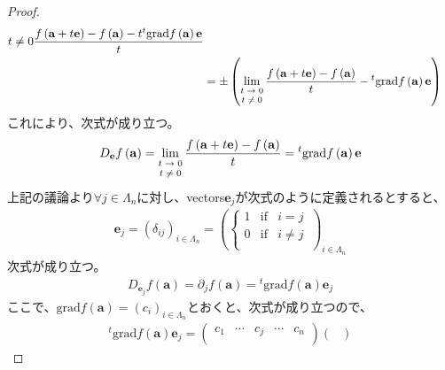 \documentclass[dvipdfmx]{jsarticle}
\begin{document}
\begin{proof}
\begin{align*}
{\begin{matrix}
t \neq 0 \\
\end{matrix}}\frac{f\left( \mathbf{a} + t\mathbf{e} \right) - f\left( \mathbf{a} \right) - t{}^{t}\mathrm{grad}f\left( \mathbf{a} \right)\mathbf{e}}{t}\\
&= \pm \left( \lim_{\scriptsize \begin{matrix}
t \rightarrow 0 \\
t \neq 0 \\
\end{matrix}}\frac{f\left( \mathbf{a} + t\mathbf{e} \right) - f\left( \mathbf{a} \right)}{t} -{}^{t}\mathrm{grad}f\left( \mathbf{a} \right)\mathbf{e} \right)
\end{align*}
これにより、次式が成り立つ。
\begin{align*}
D_{\mathbf{e}}f\left( \mathbf{a} \right) = \lim_{\scriptsize \begin{matrix}
t \rightarrow 0 \\
t \neq 0 \\
\end{matrix}}\frac{f\left( \mathbf{a} + t\mathbf{e} \right) - f\left( \mathbf{a} \right)}{t} ={}^{t}\mathrm{grad}f\left( \mathbf{a} \right)\mathbf{e}
\end{align*}
上記の議論より$\forall j \in \varLambda_{n}$に対し、vectors$\mathbf{e}_{j}$が次式のように定義されるとすると、
\begin{align*}
\mathbf{e}_{j} = \left( \delta_{ij} \right)_{i \in \varLambda_{n}} = \left( \left\{ \begin{matrix}
1 & \mathrm{if} & i = j \\
0 & \mathrm{if} & i \neq j \\
\end{matrix} \right.\  \right)_{i \in \varLambda_{n}}
\end{align*}
次式が成り立つ。
\begin{align*}
D_{\mathbf{e}_{j}}f\left( \mathbf{a} \right) = \partial_{j}f\left( \mathbf{a} \right) ={}^{t}\mathrm{grad}f\left( \mathbf{a} \right)\mathbf{e}_{j}
\end{align*}
ここで、$\mathrm{grad}f\left( \mathbf{a} \right) = \left( c_{i} \right)_{i \in \varLambda_{n}}$とおくと、次式が成り立つので、
\begin{align*}
{}^{t}\mathrm{grad}f\left( \mathbf{a} \right)\mathbf{e}_{j} = \begin{pmatrix}
c_{1} & \cdots & c_{j} & \cdots & c_{n} \\
\end{pmatrix}\begin{pmatrix}

\end{pmatrix}
\end{align*}
\end{proof}
\end{document}
